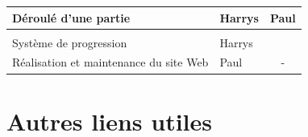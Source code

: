 \documentclass[french, 12pt]{article}
\begin{document}
\begin{table}[!htb]
\begin{tabular}{|l|l|l|}
    Déroulé d'une partie                   & \cellcolor[HTML]{F8A102}Harrys     & \cellcolor[HTML]{9698ED}Paul       \\ \hline
    \multicolumn{3}{|l|}{\cellcolor[HTML]{343434}{\color[HTML]{FFFFFF} \textbf{Autre}}}                              \\ \hline
    Système de progression                 & \cellcolor[HTML]{F8A102}Harrys     &                                    \\ \hline
    Réalisation et maintenance du site Web & \cellcolor[HTML]{9698ED}Paul       & \multicolumn{1}{c|}{-}             \\ \hline
    \end{tabular}
    \end{table}

\newpage

\newpage


\newpage



\newpage

\newpage

\newpage

\section{Autres liens utiles}
\end{document}
